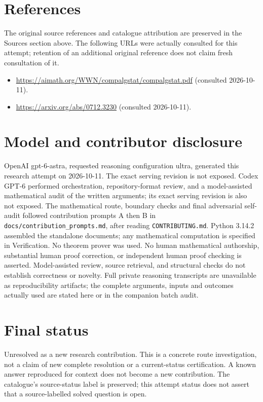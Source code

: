 \documentclass[11pt]{article}
\begin{document}
\section{References}
The original source references and catalogue attribution are preserved in the
Sources section above. The following URLs were actually consulted for this attempt;
retention of an additional original reference does not claim fresh consultation of it.
\begin{itemize}
\item \url{https://aimath.org/WWN/compalgstat/compalgstat.pdf} (consulted 2026-10-11). 
\item \url{https://arxiv.org/abs/0712.3230} (consulted 2026-10-11). 
\end{itemize}
\section{Model and contributor disclosure}
OpenAI gpt-6-astra, requested reasoning configuration ultra, generated this research
attempt on 2026-10-11. The exact serving revision is not exposed. Codex GPT-6
performed orchestration, repository-format review, and a model-assisted mathematical
audit of the written arguments; its exact serving revision
is also not exposed. The mathematical route, boundary checks and final adversarial
self-audit followed contribution prompts A then B in
\texttt{docs/contribution\_prompts.md}, after reading \texttt{CONTRIBUTING.md}.
Python 3.14.2 assembled the standalone documents; any mathematical computation is
specified in Verification. No theorem prover was used. No human mathematical
authorship, substantial human proof correction, or independent human proof checking
is asserted. Model-assisted review, source retrieval, and structural checks do not
establish correctness or novelty. Full private reasoning transcripts are unavailable
as reproducibility artifacts; the complete arguments, inputs and outcomes actually
used are stated here or in the companion batch audit.
\section{Final status}
Unresolved as a new research contribution. This is a concrete route investigation,
not a claim of new complete resolution or a current-status certification. A known
answer reproduced for context does not become a new contribution. The catalogue's
source-status label is preserved; this attempt status does not assert that a
source-labelled solved question is open.
\end{document}
